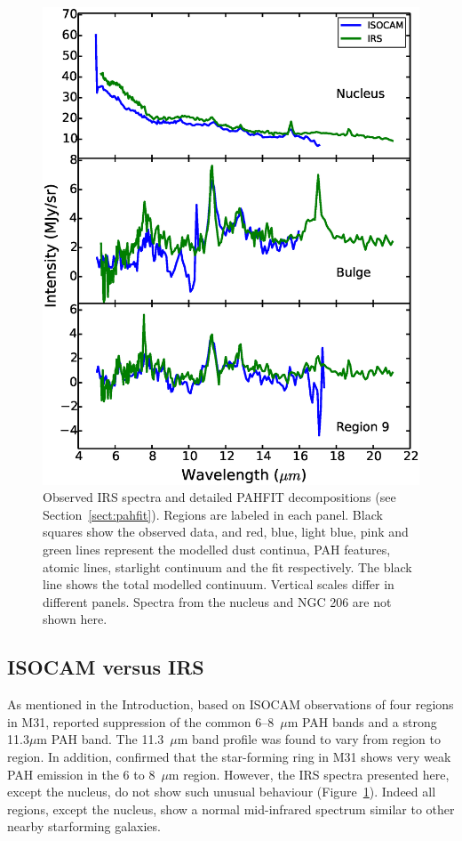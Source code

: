 \begin{figure}
\centering
\includegraphics[scale=0.45]{./fig6.eps}
 \caption{Observed IRS spectra and detailed PAHFIT decompositions (see Section~\ref{sect:pahfit}). Regions are labeled in each panel.
Black squares show the observed data, and red, blue, light blue, pink and green lines represent the modelled
dust continua, PAH features, atomic lines, starlight continuum and the fit respectively. The black line shows the total modelled continuum. 
Vertical scales differ in different panels. Spectra from the nucleus and NGC 206 are not shown here.
}
\label{PAHFITplots}
\end{figure}


\subsection{ISOCAM versus IRS}
\label{sect:iso_vs_irs}

As mentioned in the Introduction, based on ISOCAM observations of four regions in M31, \citet{1998Cesarsky} reported 
suppression of the common 6--8~$\mu$m PAH bands and a strong 11.3$\mu$m PAH band.
The 11.3~$\mu$m band profile was found to vary from region to region.  
In addition, \citet{Pagani_1999} confirmed that the star-forming ring in M31 shows very weak PAH emission in the 6 to 8~$\mu$m region. 
However, the IRS spectra presented here, except the nucleus, do not show such unusual behaviour (Figure~\ref{PAHFITplots}). 
Indeed all regions, except the nucleus, show a normal mid-infrared spectrum similar to other nearby starforming galaxies. 


